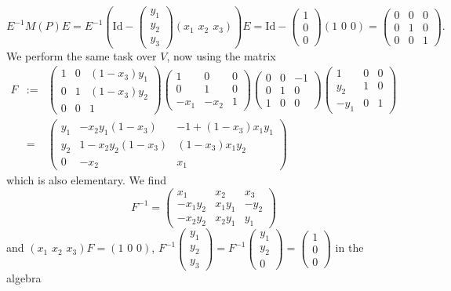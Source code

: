 \documentclass[11pt,leqno]{article}
\renewcommand{\1}{{\rm 1\hspace*{-0.4ex}%
\rule{0.1ex}{1.52ex}\hspace*{0.2ex}}}
\newcommand{\<}[1]{{\langle}#1 {\rangle}}
\theoremstyle{plain}
\theoremstyle{definition}
\theoremstyle{remark}
\numberwithin{equation}{section}
\begin{document}
\[
E^{-1}M(P)E=E^{-1}(\mathrm{Id}-\begin{pmatrix} y_1 \\ y_2 \\y_3\end{pmatrix}(x_1\phantom{i}x_2\phantom{i}x_3))E=\mathrm{Id}-\begin{pmatrix} 1 \\ 0 \\0\end{pmatrix}(1\phantom{i}0\phantom{i}0)=\begin{pmatrix} 0 & 0 & 0 \\ 0 & 1 & 0 \\ 0 & 0 & 1\end{pmatrix}.
\]
We perform the same task over $V$, now using the matrix
\begin{eqnarray*}
F& := & \begin{pmatrix}1 & 0 & (1-x_3)y_1 \\ 0 & 1 & (1-x_3)y_2 \\ 0 & 0 & 1\end{pmatrix}\begin{pmatrix}1 & 0 & 0 \\ 0 & 1 & 0 \\ -x_1 & -x_2 & 1\end{pmatrix}\begin{pmatrix}0 & 0 & -1 \\ 0 & 1 & 0 \\ 1 & 0 & 0\end{pmatrix}\begin{pmatrix} 1 & 0 & 0 \\ y_2 & 1 & 0 \\ -y_1 & 0 & 1\end{pmatrix}\\
& = & \begin{pmatrix} y_1 & -x_2y_1(1-x_3) & -1+(1-x_3)x_1y_1 \\ y_2 & 1-x_2y_2(1-x_3) & (1-x_3)x_1y_2 \\ 0 & -x_2 & x_1\end{pmatrix}
\end{eqnarray*}
which is also elementary. We find
\[
F^{-1}=\begin{pmatrix} x_1 & x_ 2 & x_3 \\ -x_1y_2 & x_1y_1 & -y_2 \\ -x_2y_2 & x_2y_1 & y_1\end{pmatrix}
\]
and $(x_1\phantom{i}x_2\phantom{i}x_3)F=(1\phantom{i}0\phantom{i}0)$, $F^{-1}\begin{pmatrix} y_1 \\ y_2 \\y_3\end{pmatrix}=F^{-1}\begin{pmatrix} y_1 \\ y_2 \\0\end{pmatrix}=\begin{pmatrix} 1 \\ 0 \\0\end{pmatrix}$ in the algebra 
\end{document}
